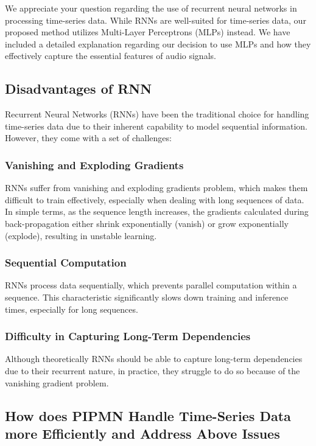 \documentclass[runningheads]{llncs}
\begin{document}
We appreciate your question regarding the use of recurrent neural networks in processing time-series data. While RNNs are well-suited for time-series data, our proposed method utilizes Multi-Layer Perceptrons (MLPs) instead. We have included a detailed explanation regarding our decision to use MLPs and how they effectively capture the essential features of audio signals.

\subsection{Disadvantages of RNN}

Recurrent Neural Networks (RNNs) have been the traditional choice for handling time-series data due to their inherent capability to model sequential information. However, they come with a set of challenges:

\subsubsection{Vanishing and Exploding Gradients}

RNNs suffer from vanishing and exploding gradients problem, which makes them difficult to train effectively, especially when dealing with long sequences of data. In simple terms, as the sequence length increases, the gradients calculated during back-propagation either shrink exponentially (vanish) or grow exponentially (explode), resulting in unstable learning.

\subsubsection{Sequential Computation}

RNNs process data sequentially, which prevents parallel computation within a sequence. This characteristic significantly slows down training and inference times, especially for long sequences.

\subsubsection{Difficulty in Capturing Long-Term Dependencies}

Although theoretically RNNs should be able to capture long-term dependencies due to their recurrent nature, in practice, they struggle to do so because of the vanishing gradient problem.

\subsection{How does PIPMN Handle Time-Series Data more Efficiently and Address Above Issues}
\end{document}
